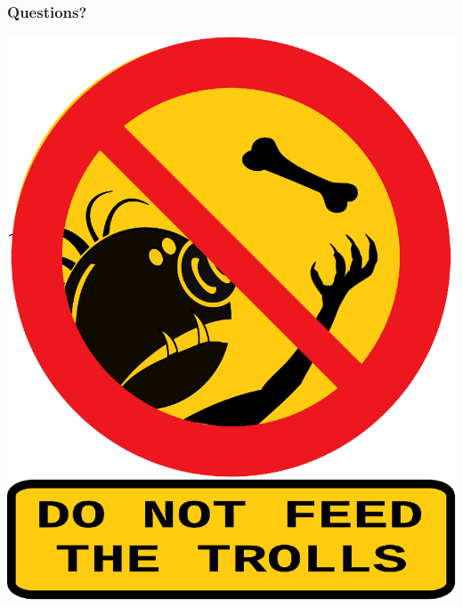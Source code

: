 \begin{frame}
	\frametitle{Questions?}
	\center
	\includegraphics[scale=0.25]{dont-feed-trolls.eps}
\end{frame}


